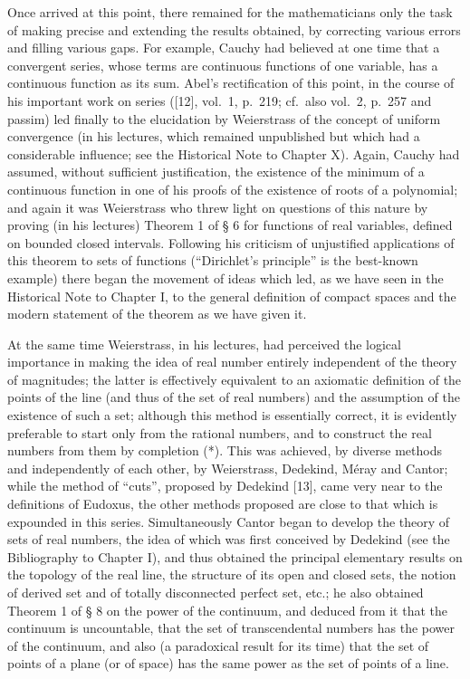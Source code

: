 Once arrived at this point, there remained for the mathematicians only the task of making precise and extending the results obtained, by correcting various errors and filling various gaps. For example, Cauchy had believed at one time that a convergent series, whose terms are continuous functions of one variable, has a continuous function as its sum. Abel's rectification of this point, in the course of his important work on series ({[}12{]}, vol.~1, p.~219; cf.~also vol.~2, p.~257 and passim) led finally to the elucidation by Weierstrass of the concept of uniform convergence (in his lectures, which remained unpublished but which had a considerable influence; see the Historical Note to Chapter X). Again, Cauchy had assumed, without sufficient justification, the existence of the minimum of a continuous function in one of his proofs of the existence of roots of a polynomial; and again it was Weierstrass who threw light on questions of this nature by proving (in his lectures) Theorem 1 of § 6 for functions of real variables, defined on bounded closed intervals. Following his criticism of unjustified applications of this theorem to sets of functions (``Dirichlet's principle'' is the best-known example) there began the movement of ideas which led, as we have seen in the Historical Note to Chapter I, to the general definition of compact spaces and the modern statement of the theorem as we have given it.

At the same time Weierstrass, in his lectures, had perceived the logical importance in making the idea of real number entirely independent of the theory of magnitudes; the latter is effectively equivalent to an axiomatic definition of the points of the line (and thus of the set of real numbers) and the assumption of the existence of such a set; although this method is essentially correct, it is evidently preferable to start only from the rational numbers, and to construct the real numbers from them by completion (*). This was achieved, by diverse methods and independently of each other, by Weierstrass, Dedekind, Méray and Cantor; while the method of ``cuts'', proposed by Dedekind {[}13{]}, came very near to the definitions of Eudoxus, the other methods proposed are close to that which is expounded in this series. Simultaneously Cantor began to develop the theory of sets of real numbers, the idea of which was first conceived by Dedekind (see the Bibliography to Chapter I), and thus obtained the principal elementary results on the topology of the real line, the structure of its open and closed sets, the notion of derived set and of totally disconnected perfect set, etc.; he also obtained Theorem 1 of § 8 on the power of the continuum, and deduced from it that the continuum is uncountable, that the set of transcendental numbers has the power of the continuum, and also (a paradoxical result for its time) that the set of points of a plane (or of space) has the same power as the set of points of a line.

